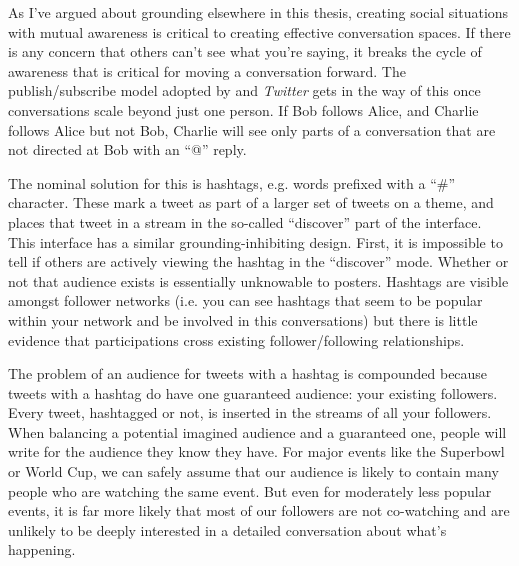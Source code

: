 As I've argued about grounding elsewhere in this thesis, creating social situations with mutual awareness is critical to creating effective conversation spaces. If there is any concern that others can't see what you're saying, it breaks the cycle of awareness that is critical for moving a conversation forward. The publish/subscribe model adopted by and \emph{Twitter} gets in the way of this once conversations scale beyond just one person. If Bob follows Alice, and Charlie follows Alice but not Bob, Charlie will see only parts of a conversation that are not directed at Bob with an ``@'' reply. 

The nominal solution for this is hashtags, e.g. words prefixed with a ``\#'' character. These mark a tweet as part of a larger set of tweets on a theme, and places that tweet in a stream in the so-called ``discover'' part of the interface. This interface has a similar grounding-inhibiting design. First, it is impossible to tell if others are actively viewing the hashtag in the ``discover'' mode. Whether or not that audience exists is essentially unknowable to posters. Hashtags are visible amongst follower networks (i.e. you can see hashtags that seem to be popular within your network and be involved in this conversations) but there is little evidence that participations cross existing follower/following relationships.

The problem of an audience for tweets with a hashtag is compounded because tweets with a hashtag do have one guaranteed audience: your existing followers. Every tweet, hashtagged or not, is inserted in the streams of all your followers. When balancing a potential imagined audience and a guaranteed one, people will write for the audience they know they have. For major events like the Superbowl or World Cup, we can safely assume that our audience is likely to contain many people who are watching the same event. But even for moderately less popular events, it is far more likely that most of our followers are not co-watching and are unlikely to be deeply interested in a detailed conversation about what's happening. 

